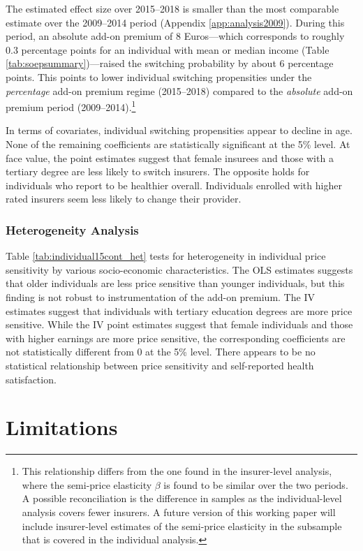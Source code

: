 \documentclass[a4paper, 11pt, english]{article}
\begin{document}
The estimated effect size over 2015--2018 is smaller than the most comparable estimate over the 2009--2014 period (Appendix \ref{app:analysis2009}). During this period, an absolute add-on premium of 8 Euros---which corresponds to roughly 0.3 percentage points for an individual with mean  or median income (Table \ref{tab:soepsummary})---raised the switching probability by about 6 percentage points. This points to lower individual switching propensities under the \textit{percentage} add-on premium regime (2015--2018) compared to the \textit{absolute} add-on premium period (2009--2014).\footnote{This relationship differs from the one found in the insurer-level analysis, where the semi-price elasticity $\beta$ is found to be similar over the two periods. A possible reconciliation is the difference in samples as the individual-level analysis covers fewer insurers. A future version of this working paper will include insurer-level estimates of the semi-price elasticity in the subsample that is covered in the individual analysis.}

In terms of covariates, individual switching propensities appear to decline in age. None of the remaining coefficients are statistically significant at the 5\% level. At face value, the point estimates suggest that female insurees and those with a tertiary degree are less likely to switch insurers. The opposite holds for individuals who report to be healthier overall. Individuals enrolled with higher rated insurers seem less likely to change their provider.

\subsubsection*{Heterogeneity Analysis}

Table \ref{tab:individual15cont_het} tests for heterogeneity in individual price sensitivity by various socio-economic characteristics. The OLS estimates suggests that older individuals are less price sensitive than younger individuals, but this finding is not robust to instrumentation of the add-on premium. The IV estimates suggest that individuals with tertiary education degrees are more price sensitive. While the IV point estimates suggest that female individuals and those with higher earnings are more price sensitive, the corresponding coefficients are not statistically different from 0 at the 5\% level. There appears to be no statistical relationship between price sensitivity and self-reported health satisfaction.


\section{Limitations \label{sec:limitations}}
\end{document}
